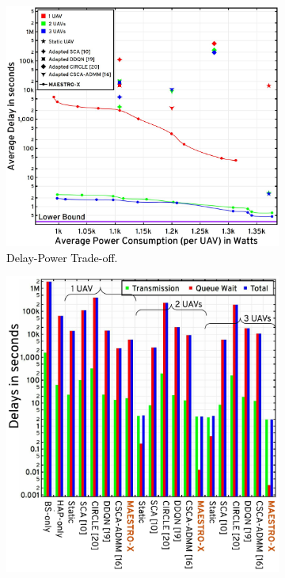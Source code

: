 \documentclass[12pt, draftcls, onecolumn]{IEEEtran}
\theoremstyle{plain}
\theoremstyle{definition}
\theoremstyle{remark}
\newcommand\hlt[1]{\textcolor{black}{#1}}
\begin{document}
\begin{figure} [t]
     \begin{subfigure}{0.55\linewidth}
         \centering
         \includegraphics[width=1.0\linewidth]{figs/Delay_Power_10Mb_Scatter_High_Congestion.jpg}
         \caption{\hlt{Delay-Power Trade-off.}}
         \label{F8a}
     \end{subfigure}
     \begin{subfigure}{0.448\linewidth}
         \centering
         \includegraphics[width=1.0\linewidth]{figs/Delay_Power_10Mb_Chart_High_Congestion.jpeg}

\end{subfigure}
\end{figure}
\end{document}
